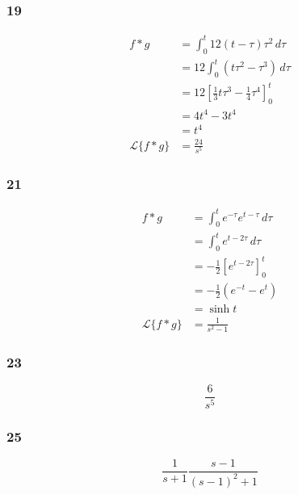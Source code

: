 \documentclass{article}
\begin{document}
\subsubsection{19}

\begin{align*}
  f * g                & = \int_0^t 12 (t - \tau) \tau^2 \,d\tau                           \\
                       & = 12 \int_0^t (t \tau^2 - \tau^3) \,d\tau                         \\
                       & = 12 \left[ \frac{1}{3} t \tau^3 - \frac{1}{4} \tau^4 \right]_0^t \\
                       & = 4 t^4 - 3 t^4                                                   \\
                       & = t^4                                                             \\
  \mathcal{L}\{f * g\} & = \frac{24}{s^5}
\end{align*}

\subsubsection{21}

\begin{align*}
  f * g                & = \int_0^t e^{-\tau} e^{t - \tau} \,d\tau \\
                       & = \int_0^t e^{t - 2 \tau} \,d\tau         \\
                       & = -\frac{1}{2} [e^{t - 2 \tau}]_0^t       \\
                       & = -\frac{1}{2} (e^{-t} - e^{t})           \\
                       & = \sinh t                                 \\
  \mathcal{L}\{f * g\} & = \frac{1}{s^2 - 1}
\end{align*}

\subsubsection{23}

\[\frac{6}{s^5}\]

\subsubsection{25}

\[\frac{1}{s + 1} \frac{s - 1}{(s - 1)^2 + 1}\]
\end{document}
